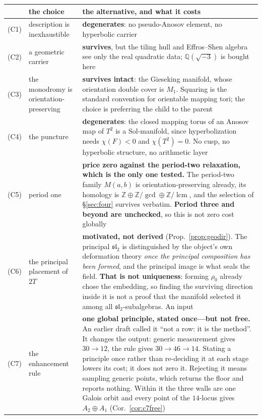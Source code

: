\documentclass[11pt,reqno]{amsart}
\theoremstyle{plain}
\theoremstyle{definition}
\theoremstyle{remark}
\newcommand{\Q}{\mathbb{Q}}
\newcommand{\Z}{\mathbb{Z}}
\newcommand{\sll}{\mathfrak{sl}}
\begin{document}
\begin{table}[htbp]
\centering\small
\begin{tabular}{@{}p{}p{}p{}@{}}
\toprule
 & the choice & the alternative, and what it costs\\
\midrule
(C1) & description is inexhaustible & \textbf{degenerates}: no pseudo-Anosov element, no hyperbolic carrier\\
(C2) & a geometric carrier & \textbf{survives}, but the tiling hull and Effros--Shen algebra see only the real quadratic data; $\Q(\sqrt{-3})$ is bought here\\
(C3) & the monodromy is orientation-preserving & \textbf{survives intact}: the Gieseking manifold, whose orientation double cover is $M_1$. Squaring is the standard convention for orientable mapping tori; the choice is preferring the child to the parent\\
(C4) & the puncture & \textbf{degenerates}: the closed mapping torus of an Anosov map of $T^2$ is a $\mathrm{Sol}$-manifold, since hyperbolization needs $\chi(F)<0$ and $\chi(T^2)=0$. No cusp, no hyperbolic structure, no arithmetic layer\\
(C5) & period one & \textbf{price zero against the period-two relaxation, which is the only one tested.} The period-two family $M(a,b)$ is orientation-preserving already, its homology is $\Z\oplus\Z/\!\gcd\oplus\Z/\!\operatorname{lcm}$, and the selection of \S\ref{sec:four} survives verbatim. \textbf{Period three and beyond are unchecked}, so this is not zero cost globally\\
(C6) & the principal placement of $2T$ & \textbf{motivated, not derived} (Prop.~\ref{prop:geodir}). The principal $\sll_2$ is distinguished by the object's own deformation theory \emph{once the principal composition has been formed}, and the principal image is what seals the field. \textbf{That is not uniqueness}: forming $\rho_0$ already chose the embedding, so finding the surviving direction inside it is not a proof that the manifold selected it among all $\sll_2$-subalgebras. An input\\
(C7) & the enhancement rule & \textbf{one global principle, stated once---but not free.} An earlier draft called it ``not a row: it is the method''. It changes the output: generic measurement gives $30\to12$, the rule gives $30\to46\to14$. Stating a principle once rather than re-deciding it at each stage lowers its cost; it does not zero it. Rejecting it means sampling generic points, which returns the floor and reports nothing. Within it the three walls are one Galois orbit and every point of the $14$-locus gives $A_2{\oplus}A_1$ (Cor.~\ref{cor:c7free})\\

\end{tabular}
\end{table}
\end{document}
